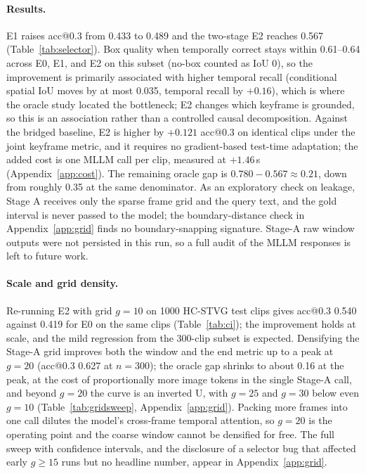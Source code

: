 \documentclass[10pt]{article}
\begin{document}
\paragraph{Results.}
E1 raises acc@0.3 from 0.433 to 0.489 and the two-stage E2 reaches 0.567 (Table~\ref{tab:selector}). Box quality when temporally correct stays within 0.61--0.64 across E0, E1, and E2 on this subset (no-box counted as IoU 0), so the improvement is primarily associated with higher temporal recall (conditional spatial IoU moves by at most 0.035, temporal recall by $+0.16$), which is where the oracle study located the bottleneck; E2 changes which keyframe is grounded, so this is an association rather than a controlled causal decomposition. Against the bridged baseline, E2 is higher by $+0.121$ acc@0.3 on identical clips under the joint keyframe metric, and it requires no gradient-based test-time adaptation; the added cost is one MLLM call per clip, measured at $+1.46$\,s (Appendix~\ref{app:cost}). The remaining oracle gap is $0.780-0.567\approx 0.21$, down from roughly 0.35 at the same denominator. As an exploratory check on leakage, Stage A receives only the sparse frame grid and the query text, and the gold interval is never passed to the model; the boundary-distance check in Appendix~\ref{app:grid} finds no boundary-snapping signature. Stage-A raw window outputs were not persisted in this run, so a full audit of the MLLM responses is left to future work.

\paragraph{Scale and grid density.}
Re-running E2 with grid $g=10$ on 1000 HC-STVG test clips gives acc@0.3 0.540 against 0.419 for E0 on the same clips (Table~\ref{tab:ci}); the improvement holds at scale, and the mild regression from the 300-clip subset is expected. Densifying the Stage-A grid improves both the window and the end metric up to a peak at $g=20$ (acc@0.3 0.627 at $n=300$); the oracle gap shrinks to about 0.16 at the peak, at the cost of proportionally more image tokens in the single Stage-A call, and beyond $g=20$ the curve is an inverted U, with $g=25$ and $g=30$ below even $g=10$ (Table~\ref{tab:gridsweep}, Appendix~\ref{app:grid}). Packing more frames into one call dilutes the model's cross-frame temporal attention, so $g=20$ is the operating point and the coarse window cannot be densified for free. The full sweep with confidence intervals, and the disclosure of a selector bug that affected early $g\ge 15$ runs but no headline number, appear in Appendix~\ref{app:grid}.
\end{document}
